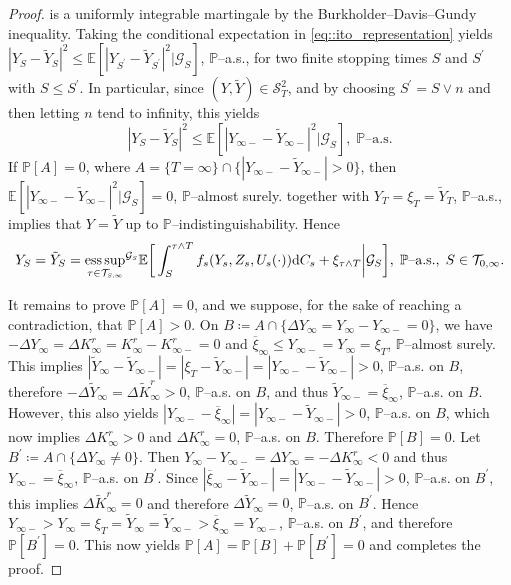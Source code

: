 \documentclass[10pt]{article} %
\newcommand\cG{\mathcal G}
\newcommand\cS{\mathcal S}
\newcommand\cT{\mathcal T}
\newcommand{\smalltext}[1]{\text{\fontsize{4}{4}\selectfont$#1$}}
\def \E{\mathbb{E}}
\def \P{\mathbb{P}}
\newcommand{\1}{\mathbf{1}}
\def\d{\mathrm{d}}
\DeclareMathOperator*{\esssup}{ess\,sup}
\begin{document}
\begin{proof}
	is a uniformly integrable martingale by the Burkholder--Davis--Gundy inequality. Taking the conditional expectation in \eqref{eq::ito_representation} yields $|Y_S - \tilde Y_S|^2 \leq \E[|Y_{S^\prime} - \tilde Y_{S^\prime}|^2|\cG_S]$, $\P$--a.s., for two finite stopping times $S$ and $S^\prime$ with $S \leq S^\prime$. In particular, since $(Y,\tilde Y) \in \cS^2_T$, and by choosing $S^\prime = S \lor n$ and then letting $n$ tend to infinity, this yields
	\begin{equation*}
		|Y_S - \tilde Y_S|^2 \leq \E[|Y_{\infty-} - \tilde Y_{\infty-}|^2|\cG_S], \; \text{$\P$--a.s.}
	\end{equation*}
	If $\P[A] = 0$, where $A = \{T = \infty\} \cap \{|Y_{\infty-}-\tilde Y_{\infty-}| > 0\}$, then $\E[|Y_{\infty-} - \tilde Y_{\infty-}|^2|\cG_S] = 0$, $\P$--almost surely.  together with $Y_T = \xi_T = \tilde Y_T$, $\P$--a.s., implies that $Y = \tilde Y$ up to $\P$--indistinguishability. Hence
	\begin{equation*}
		Y_S = \tilde Y_S = {\esssup_{\tau \in \cT_{\smalltext{S}\smalltext{,}\smalltext{\infty}}}}^{\cG_\smalltext{S}} \E\bigg[ \int_S^{\tau \land T} f_s(Y_s,Z_s,U_s(\cdot)) \d C_s + \xi_{\tau \land T} \bigg| \cG_S\bigg], \;\text{$\P$--a.s.}, \; S \in \cT_{0,\infty}.
	\end{equation*}
	
	\medskip
	It remains to prove $\P[A] = 0$, and we suppose, for the sake of reaching a contradiction, that $\P[A] > 0$. On $B \coloneqq A \cap \{\Delta Y_\infty = Y_\infty - Y_{\infty-} = 0\}$, we have $-\Delta Y_\infty = \Delta K^r_\infty = K^r_\infty - K^r_{\infty-} = 0$ and $\overline\xi_\infty \leq Y_{\infty-} = Y_\infty = \xi_T$, $\P$--almost surely. This implies $|\tilde Y_\infty - \tilde Y_{\infty-}| = |\xi_T - \tilde Y_{\infty-}| = |Y_{\infty-} - \tilde Y_{\infty-}| > 0$, $\P$--a.s. on $B$, therefore $-\Delta \tilde Y_\infty = \Delta\tilde K^r_\infty > 0$, $\P$--a.s. on $B$, and thus $\tilde Y_{\infty-} = \overline\xi_\infty$, $\P$--a.s. on $B$. However, this also yields $|Y_{\infty-} - \overline\xi_\infty| = |Y_{\infty-} - \tilde Y_{\infty-}| > 0$, $\P$--a.s. on $B$, which now implies $\Delta K^r_\infty > 0$ and $\Delta K^r_\infty = 0$, $\P$--a.s. on $B$. Therefore $\P[B] = 0$. Let $B^\prime \coloneqq A \cap \{\Delta Y_\infty \neq 0\}$. Then $Y_{\infty} - Y_{\infty-} = \Delta Y_\infty = -\Delta K^r_\infty < 0$ and thus $Y_{\infty-} = \overline\xi_\infty$, $\P$--a.s. on $B^\prime$. Since $|\overline\xi_\infty - \tilde Y_{\infty-}| = |Y_{\infty-} - \tilde Y_{\infty-}| > 0$, $\P$--a.s. on $B^\prime$, this implies $\Delta \tilde K^r_\infty = 0$ and therefore $\Delta\tilde Y_\infty = 0$, $\P$--a.s. on $B^\prime$. Hence $Y_{\infty-} > Y_\infty = \xi_T = \tilde Y_{\infty} = \tilde Y_{\infty-} > \overline \xi_\infty = Y_{\infty-}$, $\P$--a.s. on $B^\prime$, and therefore $\P[B^\prime] = 0$. This now yields $\P[A] = \P[B] + \P[B^\prime] = 0$ and completes the proof.
\end{proof}
\end{document}
